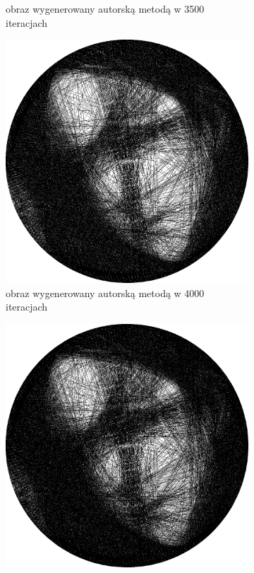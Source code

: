 \documentclass[a4paper, 12pt, polish, twoside]{extreport}
\begin{document}
\begin{figure}[H]
\begin{subfigure}{0.24\textwidth}
        \caption{obraz wygenerowany autorską metodą w 3500 iteracjach}
        \label{comp-comp-magdalene-e}
    \end{subfigure}
    \begin{subfigure}{0.24\textwidth}
        \centering
        \includegraphics[width = \textwidth]{img/6-comp/magdalene_e_i4000_c20_inv0_bg1_obj10_ed1.png}
        \caption{obraz wygenerowany autorską metodą w 4000 iteracjach}
        \label{comp-comp-magdalene-f}
    \end{subfigure}
    \begin{subfigure}{0.24\textwidth}
        \centering
        \includegraphics[width = \textwidth]{img/6-comp/magdalene_e_i4500_c20_inv0_bg1_obj10_ed1.png}

\end{subfigure}
\end{figure}
\end{document}

